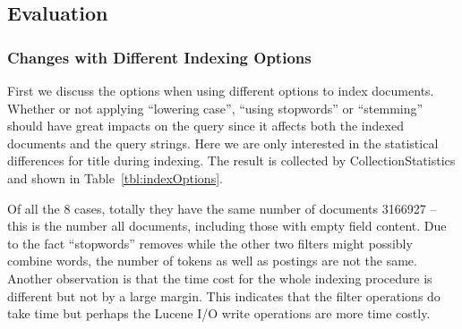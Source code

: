 \subsection{Evaluation}

\subsubsection{Changes with Different Indexing Options}
First we discuss the options when using different options to index documents. Whether or not applying ``lowering case'', ``using stopwords'' or ``stemming'' should have great impacts on the query since it affects both the indexed documents and the query strings. Here we are only interested in the statistical differences for \textsf{title} during indexing. The result is collected by \textsf{CollectionStatistics} and shown in Table~\ref{tbl:indexOptions}.

Of all the 8 cases, totally they have the same number of documents 3166927 -- this is the number all documents, including those with empty field content. Due to the fact ``stopwords'' removes while the other two filters might possibly combine words, the number of tokens as well as postings are not the same. Another observation is that the time cost for the whole indexing procedure is different but not by a large margin. This indicates that the filter operations do take time but perhaps the Lucene I/O write operations are more time costly.


